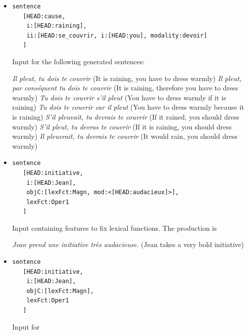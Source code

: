 \documentclass[11pt]{article}
\begin{document}
\begin{itemize}
	      \begin{exe}
		      \ex \textit{Il va pleuvoir le lundi 18 mars 2019.} (It will rain on Monday, March 18, 2019)
	      \end{exe}

	\item
	      \begin{verbatim}
sentence
   [HEAD:cause,
    i:[HEAD:raining],
    ii:[HEAD:se_couvrir, i:[HEAD:you], modality:devoir]
   ]
\end{verbatim}

	      Input for the following generated sentences:
	      \begin{exe}
		      \ex \begin{xlist}
			      \ex \textit{Il pleut, tu dois te couvrir} (It is raining, you have to dress warmly)
			      \ex \textit{Il pleut, par conséquent tu dois te couvrir} (It is raining, therefore you have to dress warmly)
			      \ex \textit{Tu dois te couvrir s'il pleut} (You have to dress warmly if it is raining)
			      \ex \textit{Tu dois te couvrir car il pleut} (You have to dress warmly because it is raining)
			      \ex \textit{S'il pleuvait, tu devrais te couvrir} (If it rained, you should dress warmly)
			      \ex \textit{S'il pleut, tu devras te couvrir} (If it is raining, you should dress warmly)
			      \ex \textit{Il pleuvrait, tu devrais te couvrir} (It would rain, you should dress warmly)
		      \end{xlist}
	      \end{exe}

	\item
	      \begin{verbatim}
sentence 
   [HEAD:initiative, 
    i:[HEAD:Jean], 
    objC:[lexFct:Magn, mod:<[HEAD:audacieux]>], 
    lexFct:Oper1
   ]
\end{verbatim}

	      Input containing features to fix lexical functions. The
	      production is
	      \begin{exe}
		      \ex \textit{Jean prend une initiative très audacieuse.} (Jean takes a very bold initiative)
	      \end{exe}

	\item
	      \begin{verbatim}
sentence 
   [HEAD:initiative, 
    i:[HEAD:Jean], 
    objC:[lexFct:Magn], 
    lexFct:Oper1
   ]
\end{verbatim}

	      Input for


\end{itemize}
\end{document}
